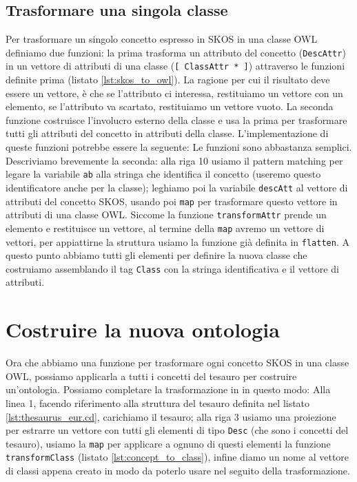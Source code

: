 \subsection{Trasformare una singola classe}
Per trasformare un singolo concetto espresso in SKOS in una classe OWL definiamo due funzioni: la prima trasforma un attributo del concetto (\verb|DescAttr|) in un vettore di attributi di una classe (\verb|[ ClassAttr * ]|) attraverso le funzioni definite prima (listato \ref{lst:skos_to_owl}). La ragione per cui il risultato deve essere un vettore, è che se l'attributo ci interessa, restituiamo un vettore con un elemento, se l'attributo va scartato, restituiamo un vettore vuoto. La seconda funzione costruisce l'involucro esterno della classe e usa la prima per trasformare tutti gli attributi del concetto in attributi della classe. L'implementazione di queste funzioni potrebbe essere la seguente:
Le funzioni sono abbastanza semplici. Descriviamo brevemente la seconda: alla riga 10 usiamo il pattern matching per legare la variabile \verb|ab| alla stringa che identifica il concetto (useremo questo identificatore anche per la classe); leghiamo poi la variabile \verb|descAtt| al vettore di attributi del concetto SKOS, usando poi \verb|map| per trasformare questo vettore in attributi di una classe OWL. Siccome la funzione \verb|transformAttr| prende un elemento e restituisce un vettore, al termine della \verb|map| avremo un vettore di vettori, per appiattirne la struttura usiamo la funzione già definita in \cduce \verb|flatten|. A questo punto abbiamo tutti gli elementi per definire la nuova classe che costruiamo assemblando il tag \verb|Class| con la stringa identificativa e il vettore di attributi.
\section{Costruire la nuova ontologia}
Ora che abbiamo una funzione per trasformare ogni concetto SKOS in una classe OWL, possiamo applicarla a tutti i concetti del tesauro per costruire un'ontologia. Possiamo completare la trasformazione in \cduce in questo modo:
Alla linea 1, facendo riferimento alla struttura del tesauro definita nel listato \ref{lst:thesaurus_eur.cd}, carichiamo il tesauro; alla riga 3 usiamo una proiezione per estrarre un vettore con tutti gli elementi di tipo \verb|Desc| (che sono i concetti del tesauro), usiamo la \verb|map| per applicare a ognuno di questi elementi la funzione \verb|transformClass| (listato \ref{lst:concept_to_class}), infine diamo un nome al vettore di classi appena creato in modo da poterlo usare nel seguito della trasformazione.

